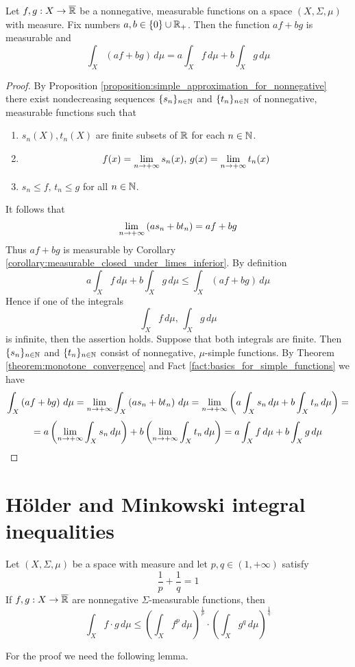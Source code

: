 \begin{proposition}\label{proposition:integral_is_linear}
    Let $f,g:X\rightarrow \overline{{\mathbb R}}$ be a nonnegative, measurable functions on a space $(X,\Sigma,\mu)$ with measure. Fix numbers $a, b\in \{0\}\cup {\mathbb R}_+$. Then the function $a f+b  g$ is measurable and
    $$\int_X\left(a f+b  g\right)\,d\mu = a \int_Xf\,d\mu + b \int_Xg\,d\mu$$
\end{proposition}
\begin{proof}
    By Proposition \ref{proposition:simple_approximation_for_nonnegative} there exist nondecreasing sequences $\{s_n\}_{n\in {\mathbb N}}$ and $\{t_n\}_{n\in {\mathbb N}}$ of nonnegative, measurable functions such that
    \begin{enumerate}[label=\textbf{(\arabic*)}, leftmargin=*]
        \item $s_n(X),t_n(X)$ are finite subsets of ${\mathbb R}$ for each $n\in {\mathbb N}$.
        \item $$f(x) = \lim_{n\rightarrow +\infty}s_n(x),\,g(x) = \lim_{n\rightarrow +\infty}t_n(x)$$
        \item $s_n \leq f,\,t_n\leq g$ for all $n \in {\mathbb N}$.
    \end{enumerate}
    It follows that
    $$\lim_{n \rightarrow +\infty}\left(as_n + bt_n\right) = af + bg$$
    Thus $af+bg$ is measurable by Corollary \ref{corollary:measurable_closed_under_limes_inferior}.
    By definition
    $$a \int_Xf\,d\mu + b \int_Xg\,d\mu \leq \int_X\left(a f+b  g\right)\,d\mu $$
    Hence if one of the integrals
    $$\int_Xf\,d\mu,\,\int_Xg\,d\mu$$
    is infinite, then the assertion holds. Suppose that both integrals are finite. Then $\{s_n\}_{n\in {\mathbb N}}$ and $\{t_n\}_{n\in {\mathbb N}}$ consist of nonnegative, $\mu$-simple functions. By Theorem \ref{theorem:monotone_convergence} and Fact \ref{fact:basics_for_simple_functions} we have
    $$\int_X\left(a f + b g\right)\,d\mu = \lim_{n\rightarrow +\infty}\int_X\left(a s_n + b t_n\right)\,d\mu = \lim_{n\rightarrow +\infty}\left(a \int_Xs_n\,d\mu + b \int_Xt_n\,d\mu\right) =$$
    $$=a  \left(\lim_{n\rightarrow +\infty}\int_Xs_n\,d\mu\right) + b \left(\lim_{n\rightarrow +\infty}\int_Xt_n\,d\mu\right) = a \int_Xf\,d\mu + b \int_Xg\,d\mu$$
\end{proof}

\section{H{\"o}lder and Minkowski integral inequalities}

\begin{theorem}[H{\"o}lder]\label{theorem:holder_inequality}
    Let $(X,\Sigma,\mu)$ be a space with measure and let $p,q \in (1,+\infty)$ satisfy
    $$\frac{1}{p} + \frac{1}{q} = 1$$
    If $f,g:X\rightarrow \overline{{\mathbb R}}$ are nonnegative $\Sigma$-measurable functions, then
    $$\int_X f\cdot g\,d\mu \leq \left(\int_X f^p\,d\mu\right)^{\frac{1}{p}}\cdot \left(\int_X g^q\,d\mu\right)^{\frac{1}{q}} $$
\end{theorem}
\noindent
For the proof we need the following lemma.

